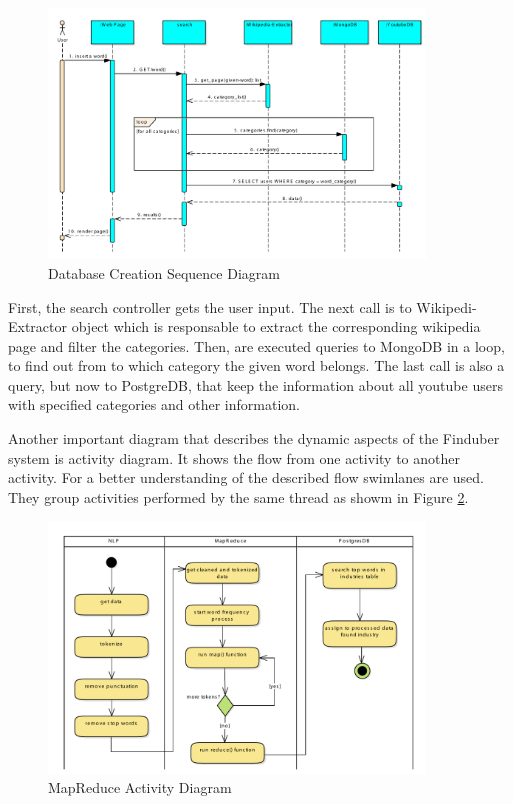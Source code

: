 \begin{figure}[!ht]
\centering
\includegraphics[width=10cm]{SearchDB}
\caption{Database Creation Sequence Diagram}\label{mapreduce_uml}
\end{figure}

First, the search controller gets the user input. The next call is to Wikipedi-Extractor object which is responsable to extract the corresponding wikipedia page and filter the categories. Then, are executed queries to MongoDB in a loop, to find out from to which category the given word belongs. The last call is also a query, but now to PostgreDB, that keep the information about all youtube users with specified categories and other information.

Another important diagram that describes the dynamic aspects of the Finduber system is activity diagram. It shows the flow from one activity to another activity. For a better understanding of the described flow swimlanes are used. They group activities performed by the same thread as showm in Figure \ref{doc_uml}. 

\begin{figure}[!ht]
\centering
\includegraphics[width=10cm]{MapReduce}
\caption{MapReduce Activity Diagram}\label{doc_uml}
\end{figure}

